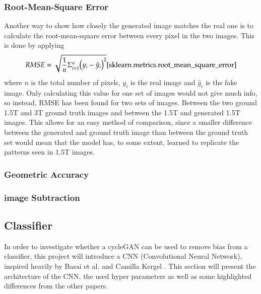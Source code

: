 \documentclass[12pt, fleqn, titlepage]{article}
\begin{document}
\subsubsection{Root-Mean-Square Error}\label{rmse}
Another way to show how closely the generated image matches the real one is to calculate the root-mean-square error between every pixel in the two images. This is done by applying
\begin{equation}
	RMSE = \sqrt{\frac{1}{n}\Sigma_{i=1}^{n}{\Big(y_i - \hat{y}_i\Big)^2}}\cite{sklearn.metrics.root_mean_square_error}
\end{equation}
where $n$ is the total number of pixels, $y_i$ is the real image and $\hat{y}_i$ is the fake image. Only calculating this value for one set of images would not give much info, so instead, RMSE has been found for two sets of images. Between the two ground 1.5T and 3T ground truth images and between the 1.5T and generated 1.5T images. This allows for an easy method of comparison, since a smaller difference between the generated and ground truth image than between the ground truth set would mean that the model has, to some extent, learned to replicate the patterns seen in 1.5T images.

\subsubsection{Geometric Accuracy}\label{geometric_accuracy}


\subsubsection{image Subtraction}\label{image_subtraction}



\subsection{Classifier}

In order to investigate whether a cycleGAN can be used to remove bias from a classifier, this project will introduce a CNN (Convolutional Neural Network), inspired heavily by Basai et al. and Camilla Kergel \cite{CamillaKandidat} \cite{neuro}. This section will present the architecture of the CNN, the used hyper parameters as well as some highlighted differences from the other papers.
\end{document}
